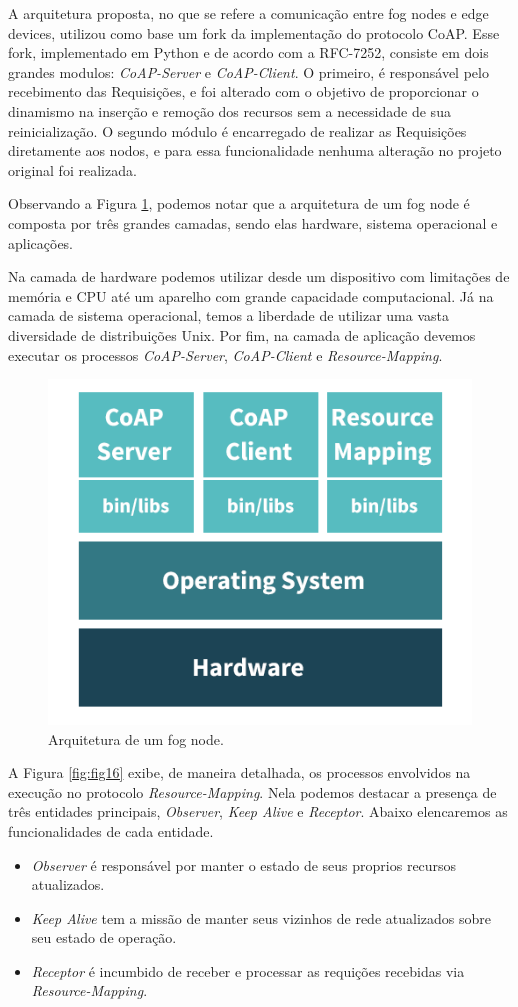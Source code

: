 A arquitetura proposta, no que se refere a comunicação entre fog nodes e edge devices, utilizou como base um fork da implementação do protocolo CoAP\cite{coapimpl:2018}.
Esse fork, implementado em Python e de acordo com a RFC-7252, consiste em dois grandes modulos: \textit{CoAP-Server} e \textit{CoAP-Client}.
O primeiro, é responsável pelo recebimento das Requisições, e foi alterado com o objetivo de proporcionar o dinamismo na inserção e remoção dos recursos sem a necessidade de sua reinicialização.
O segundo módulo é encarregado de realizar as Requisições diretamente aos nodos, e para essa funcionalidade nenhuma alteração no projeto original foi realizada.


Observando a Figura \ref{fig:fig15}, podemos notar que a arquitetura de um fog node é composta por três grandes camadas, sendo elas hardware, sistema operacional e aplicações.

Na camada de hardware podemos utilizar desde um dispositivo com limitações de memória e CPU até um aparelho com grande capacidade computacional.
Já na camada de sistema operacional, temos a liberdade de utilizar uma vasta diversidade de distribuições Unix.
Por fim, na camada de aplicação devemos executar os processos \textit{CoAP-Server}, \textit{CoAP-Client} e \textit{Resource-Mapping}.

\begin{figure}[H]
    \centering\includegraphics[width=.5\textwidth]{fig15.png}
    \caption[Arquitetura de um fog node]
    {\label{fig:fig15} Arquitetura de um fog node.}
\end{figure}

A Figura \ref{fig:fig16} exibe, de maneira detalhada, os processos envolvidos na execução no protocolo \textit{Resource-Mapping}.
Nela podemos destacar a presença de três entidades principais, \textit{Observer}, \textit{Keep Alive} e \textit{Receptor}.
Abaixo elencaremos as funcionalidades de cada entidade.

\begin{itemize}
    \item \textit{Observer} é responsável por manter o estado de seus proprios recursos atualizados.
    \item \textit{Keep Alive} tem a missão de manter seus vizinhos de rede atualizados sobre seu estado de operação.
    \item \textit{Receptor} é incumbido de receber e processar as requições recebidas via \textit{Resource-Mapping}.
\end{itemize}

